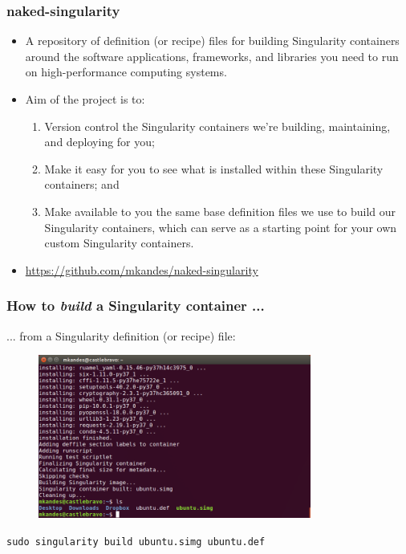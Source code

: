 \documentclass{beamer}
\begin{document}
\begin{frame}
   \frametitle{naked-singularity}
   \begin{itemize}
      \setlength\itemsep{1.0em}
      \item A repository of definition (or recipe) files for building
         Singularity containers around the software applications,
         frameworks, and libraries you need to run on high-performance
         computing systems.
      \item Aim of the project is to: \\
      \begin{enumerate}
         \setlength\itemsep{1.0em}
         \item Version control the Singularity containers we're
            building, maintaining, and deploying for you;
         \item Make it easy for you to see what is installed within
            these Singularity containers; and
         \item Make available to you the same base definition files we
            use to build our Singularity containers, which can serve as
            a starting point for your own custom Singularity containers.
      \end{enumerate}
      \item \url{https://github.com/mkandes/naked-singularity}
   \end{itemize}
\end{frame}

\begin{frame}
   \frametitle{How to \textit{build} a Singularity container ...}
   ... from a Singularity definition (or recipe) file:
   \begin{figure}[htbp]
      \includegraphics[width=0.8\textwidth]{images/singularity-build-deffile-end.png}
   \end{figure}
   \lstinline{sudo singularity build ubuntu.simg ubuntu.def}
\end{frame}
\end{document}
